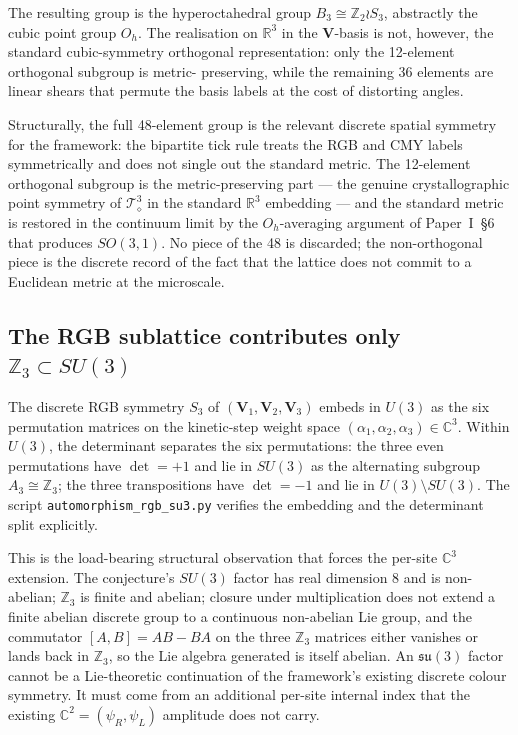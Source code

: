 The resulting group is the hyperoctahedral group
$B_3 \cong \mathbb{Z}_2 \wr S_3$, abstractly the cubic point group
$O_h$.  The realisation on $\mathbb{R}^3$ in the $\mathbf{V}$-basis
is not, however, the standard cubic-symmetry orthogonal
representation: only the 12-element orthogonal subgroup is metric-
preserving, while the remaining 36 elements are linear shears that
permute the basis labels at the cost of distorting angles.

Structurally, the full 48-element group is the relevant discrete
spatial symmetry for the framework: the bipartite tick rule treats
the RGB and CMY labels symmetrically and does not single out the
standard metric.  The 12-element orthogonal subgroup is the
metric-preserving part --- the genuine crystallographic point
symmetry of $\mathcal{T}_\diamond^3$ in the standard
$\mathbb{R}^3$ embedding --- and the standard metric is restored
in the continuum limit by the $O_h$-averaging argument of
Paper~I~§6 that produces $SO(3,1)$.  No piece of the 48 is
discarded; the non-orthogonal piece is the discrete record of the
fact that the lattice does not commit to a Euclidean metric at the
microscale.

\subsection{The RGB sublattice contributes only $\mathbb{Z}_3 \subset SU(3)$}
\label{subsec:rgb_z3_obstruction}

The discrete RGB symmetry $S_3$ of $(\mathbf{V}_1, \mathbf{V}_2,
\mathbf{V}_3)$ embeds in $U(3)$ as the six permutation matrices on
the kinetic-step weight space $(\alpha_1, \alpha_2, \alpha_3) \in
\mathbb{C}^3$.  Within $U(3)$, the determinant separates the six
permutations: the three even permutations have $\det = +1$ and lie
in $SU(3)$ as the alternating subgroup $A_3 \cong \mathbb{Z}_3$;
the three transpositions have $\det = -1$ and lie in $U(3) \setminus
SU(3)$.  The script \nolinkurl{automorphism_rgb_su3.py} verifies the
embedding and the determinant split explicitly.

This is the load-bearing structural observation that forces the
per-site $\mathbb{C}^3$ extension.  The conjecture's $SU(3)$ factor
has real dimension 8 and is non-abelian; $\mathbb{Z}_3$ is finite
and abelian; closure under multiplication does not extend a finite
abelian discrete group to a continuous non-abelian Lie group, and
the commutator $[A, B] = AB - BA$ on the three $\mathbb{Z}_3$
matrices either vanishes or lands back in $\mathbb{Z}_3$, so the
Lie algebra generated is itself abelian.  An $\mathfrak{su}(3)$
factor cannot be a Lie-theoretic continuation of the framework's
existing discrete colour symmetry.  It must come from an additional
per-site internal index that the existing $\mathbb{C}^2 = (\psi_R,
\psi_L)$ amplitude does not carry.

